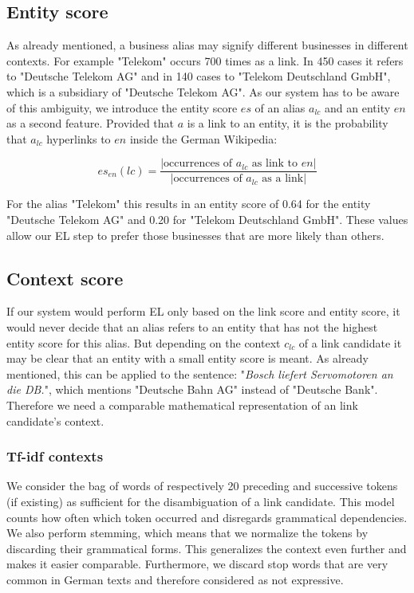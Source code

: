 \subsection{Entity score}
\label{sec:entity_score}
As already mentioned, a business alias may signify different businesses in different contexts. For example "Telekom" occurs 700 times as a link. In 450 cases it refers to "Deutsche Telekom AG" and in 140 cases to "Telekom Deutschland GmbH", which is a subsidiary of "Deutsche Telekom AG".\footnotemark{} As our system has to be aware of this ambiguity, we introduce the entity score $es$ of an alias $a_{lc}$ and an entity $en$ as a second feature. Provided that $a$ is a link to an entity, it is the probability that $a_{lc}$ hyperlinks to $en$ inside the German Wikipedia:

\begin{equation*}
es_{en}(lc) = \frac{|\text{occurrences of $a_{lc}$ as link to $en$}|}{|\text{occurrences of $a_{lc}$ as a link}|}
\end{equation*}

For the alias "Telekom" this results in an entity score of 0.64 for the entity "Deutsche Telekom AG" and 0.20 for "Telekom Deutschland GmbH". These values allow our EL step to prefer those businesses that are more likely than others.


\subsection{Context score}
\label{sec:context_score}
If our system would perform EL only based on the link score and entity score, it would never decide that an alias refers to an entity that has not the highest entity score for this alias. But depending on the context $c_{lc}$ of a link candidate it may be clear that an entity with a small entity score is meant. As already mentioned, this can be applied to the sentence: "\textit{Bosch liefert Servomotoren an die DB.}", which mentions "Deutsche Bahn AG" instead of "Deutsche Bank". Therefore we need a comparable mathematical representation of an link candidate's context.


\subsubsection{Tf-idf contexts}
\label{sec:tf_idf}
We consider the bag of words of respectively 20 preceding and successive tokens (if existing) as sufficient for the disambiguation of a link candidate. This model counts how often which token occurred and disregards grammatical dependencies. We also perform stemming, which means that we normalize the tokens by discarding their grammatical forms. This generalizes the context even further and makes it easier comparable. Furthermore, we discard stop words that are very common in German texts and therefore considered as not expressive.

